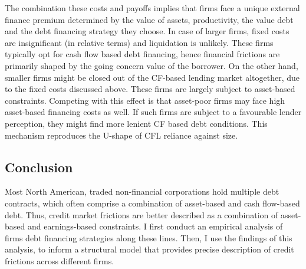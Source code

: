 \documentclass[12pt]{article}
\begin{document}
The combination these costs and payoffs implies that firms face a unique external finance premium determined by the value of assets, productivity, the value debt and the debt financing strategy they choose. In case of larger firms, fixed costs are insignificant (in relative terms) and liquidation is unlikely. These firms typically opt for cash flow based debt financing, hence financial frictions are primarily shaped by the going concern value of the borrower. On the other hand, smaller firms might be closed out of the CF-based lending market altogether, due to the fixed costs discussed above. These firms are largely subject to asset-based constraints. Competing with this effect is that asset-poor firms may face high asset-based financing costs as well. If such firms are subject to a favourable lender perception, they might find more lenient CF based debt conditions. This mechanism reproduces the U-shape of CFL reliance against size.  

\subsection*{Conclusion}

Most North American, traded non-financial corporations hold multiple debt contracts, which often comprise a combination of asset-based and cash flow-based debt. Thus, credit market frictions are better described as a combination of asset-based and earnings-based constraints. I first conduct an empirical analysis of firms debt financing strategies along these lines. Then, I use the findings of this analysis, to inform a structural model that provides precise description of credit frictions across different firms. 




\end{document}
